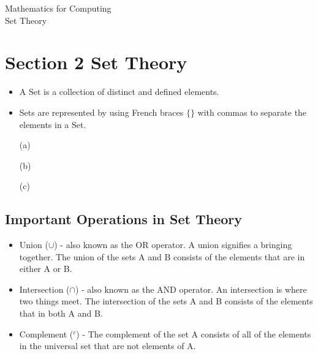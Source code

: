 \documentclass[MASTER.tex]{subfiles}
\begin{document}
\begin{center}
\huge{Mathematics for Computing}\\
\LARGE{Set Theory}
\end{center}



\section{Section 2 Set Theory}

\begin{itemize}
\item A Set is a collection of distinct and defined elements. 
\item Sets are represented by using French braces $\{ \}$ with commas to separate the elements in a Set. 
\end{itemize}

\begin{itemize}

\item[(a)] 

\item[(b)]

\item[(c)]

\end{itemize}

\subsection{Important Operations in Set Theory}

\begin{itemize}
\item Union ($\cup$) - also known as the OR operator. A union signifies a bringing together. The union of the sets A and B consists of the elements that are in either A or B.
\item Intersection ($\cap$) - also known as the AND operator. An intersection is where two things meet. The intersection of the sets A and B consists of the elements that in both A and B.
\item Complement ($^{c}$) - The complement of the set A consists of all of the elements in the universal set that are not elements of A.
\end{itemize}
\end{document}
